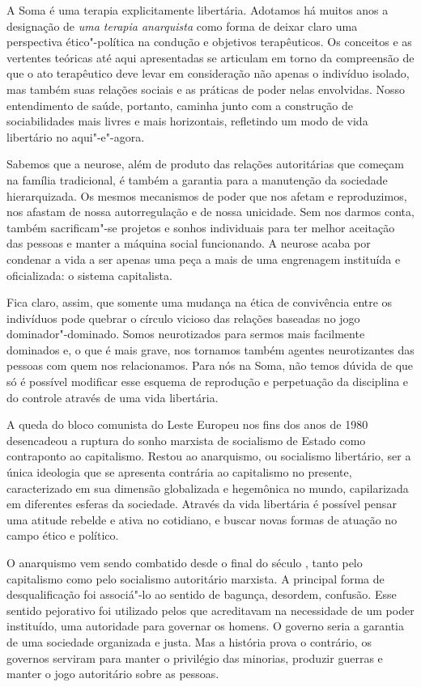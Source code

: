 A Soma é uma terapia explicitamente libertária. Adotamos há muitos anos
a designação de \emph{uma terapia anarquista} como forma de deixar claro
uma perspectiva ético"-política na condução e objetivos terapêuticos. Os
conceitos e as vertentes teóricas até aqui apresentadas se articulam em
torno da compreensão de que o ato terapêutico deve levar em consideração
não apenas o indivíduo isolado, mas também suas relações sociais e as
práticas de poder nelas envolvidas. Nosso entendimento de saúde,
portanto, caminha junto com a construção de sociabilidades mais livres e
mais horizontais, refletindo um modo de vida libertário no aqui"-e"-agora.

Sabemos que a neurose, além de produto das relações autoritárias que
começam na família tradicional, é também a garantia para a manutenção da
sociedade hierarquizada. Os mesmos mecanismos de poder que nos afetam
e reproduzimos, nos afastam de nossa autorregulação e de nossa
unicidade. Sem nos darmos conta, também sacrificam"-se projetos e sonhos
individuais para ter melhor aceitação das pessoas e manter a máquina
social funcionando. A neurose acaba por condenar a vida a ser apenas uma
peça a mais de uma engrenagem instituída e oficializada: o sistema
capitalista.

Fica claro, assim, que somente uma mudança na ética de convivência entre
os indivíduos pode quebrar o círculo vicioso das relações baseadas no
jogo dominador"-dominado. Somos neurotizados para sermos mais facilmente
dominados e, o que é mais grave, nos tornamos também agentes
neurotizantes das pessoas com quem nos relacionamos. Para nós na Soma,
não temos dúvida de que só é possível modificar esse esquema de
reprodução e perpetuação da disciplina e do controle através de uma vida
libertária.

A queda do bloco comunista do Leste Europeu nos fins dos anos de 1980
desencadeou a ruptura do sonho marxista de socialismo de Estado como
contraponto ao capitalismo. Restou ao anarquismo, ou socialismo
libertário, ser a única ideologia que se apresenta contrária ao
capitalismo no presente, caracterizado em sua dimensão globalizada e
hegemônica no mundo, capilarizada em diferentes esferas da sociedade.
Através da vida libertária é possível pensar uma atitude rebelde e ativa
no cotidiano, e buscar novas formas de atuação no campo ético e
político.

O anarquismo vem sendo combatido desde o final do século , tanto
pelo capitalismo como pelo socialismo autoritário marxista. A principal
forma de desqualificação foi associá"-lo ao sentido de bagunça, desordem,
confusão. Esse sentido pejorativo foi utilizado pelos que acreditavam na
necessidade de um poder instituído, uma autoridade para governar os
homens. O governo seria a garantia de uma sociedade organizada e justa.
Mas a história prova o contrário, os governos serviram para manter o
privilégio das minorias, produzir guerras e manter o jogo autoritário
sobre as pessoas.


